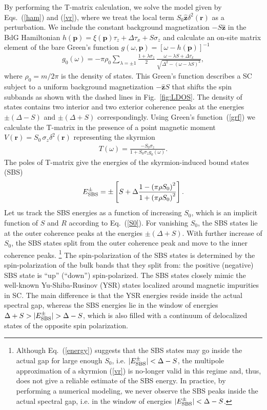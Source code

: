 \documentclass[twocolumn,showpacs,floatfix,longbibliography]{revtex4-1}
\begin{document}
By performing the T-matrix calculation, we solve the model given by Eqs.~(\ref{ham}) and (\ref{vr}), where we treat the local term $S_0 \hat{\bm z} \delta^2(\bm r)$ as a perturbation. We include the constant background magnetization $-S\hat{\bm z}$ in the BdG Hamiltonian $h(\bm p) = \xi(\bm p)\tau_z+\Delta \tau_x +  S\sigma_z$ and calculate an on-site matrix element of the bare Green's function $g(\omega,\bm p) = [\omega-h(\bm p)]^{-1}$
 \begin{align}
	 g_{0}(\omega)  =-\pi\rho_0\sum_{\lambda = \pm 1} \frac{1+\lambda\sigma_z}{2}\,\frac{\omega-\lambda S+\Delta\tau_x}{\sqrt{\Delta^2-\left( \omega-\lambda S \right)^2}},  \label{grf}
\end{align}
where $\rho_0 = m/2\pi$ is the density of states. This Green's function describes a SC subject to a uniform background magnetization $-\hat{\bm z} S$ that shifts the spin subbands as shown with the dashed lines in Fig.~\ref{fig:LDOS}.  The density of states contains two interior and two exterior coherence peaks at the energies $\pm(\Delta-S)$ and $\pm(\Delta+S)$ correspondingly.  Using Green's function~(\ref{grf}) we calculate the T-matrix in the presence of a point magnetic moment $V(\bm r)=S_0\,\sigma_z \delta^2(\bm r)$ representing the skyrmion
\begin{align}
	T(\omega) =   \frac{-S_0\sigma_z}{1+S_0\sigma_zg_{0}(\omega)}. \label{tm}
\end{align}
The poles of T-matrix give the energies of the skyrmion-induced bound states (SBS)
\begin{align}
	E^\pm_{\rm SBS} = \pm\left[S+\Delta \frac{1-\left( \pi\rho S_0 \right)^2}{1+\left( \pi\rho S_0 \right)^2}\right].
	\label{energy}
\end{align}
Let us track the SBS energies as a function of increasing $S_0$, which is an implicit function of $S$ and $R$ according to Eq.~(\ref{S0}). For vanishing $S_0$, the SBS states lie at the outer coherence peaks at the energies $\pm (\Delta+S)$. With further increase of $S_0$, the SBS states split from the outer coherence peak and move to the inner coherence peaks. \footnote{Although Eq.~(\ref{energy}) suggests that the SBS states may go inside the actual gap for large enough  $S_0$, i.e. $|E^\pm_{\rm SBS}|<\Delta-S$, the multipole approximation of a skyrmion (\ref{vr}) is no-longer valid in this regime and, thus, does not give a reliable estimate of the SBS energy. In practice, by performing a numerical modeling, we never observe the SBS peaks inside the actual spectral gap, i.e. in the window of energies $|E^\pm_{\rm SBS}|<\Delta-S$.} The spin-polarization of the SBS states is determined by the spin-polarization of the bulk bands that they split from: the positive (negative) SBS state is ``up'' (``down'') spin-polarized. The SBS states closely mimic the well-known Yu-Shiba-Rusinov (YSR) states \cite{Yu,Shiba,Rusinov,Balatsky2006} localized around magnetic impurities in SC. The main difference is that the YSR energies reside inside the actual spectral gap, whereas the SBS energies lie in the window of energies $\Delta+S>|E^\pm_{\rm SBS}|>\Delta-S$, which is also filled with a continuum of delocalized states of the opposite spin polarization.
\end{document}

